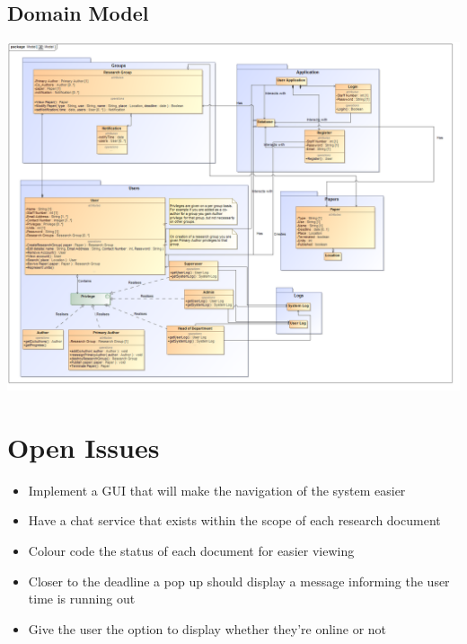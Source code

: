 \documentclass[11pt]{article}
\begin{document}
	\subsection{Domain Model}
	\begin{center}
		\includegraphics[width=\textwidth]{../DomainModel/Model.png}\\[0.5cm]
	\end{center}
	
	\section{Open Issues}
		\begin{itemize}
			\item Implement a GUI that will make the navigation of the system easier
			\item Have a chat service that exists within the scope of each research document
			\item Colour code the status of each document for easier viewing
			\item Closer to the deadline a pop up should display a message informing the user time is running out
			\item Give the user the option to display whether they're online or not
		\end{itemize}	
	\newpage
	
	{}
	
\end{document}
